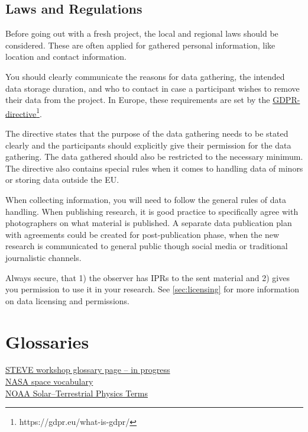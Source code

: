 \documentclass{article}
\begin{document}
\subsection{Laws and Regulations}\label{sec:data_law}

Before going out with a fresh project, the local and regional laws should be considered. These are often applied for gathered personal information, like location and contact information.  

You should clearly communicate the reasons for data gathering, the intended data storage duration, and who to contact in case a participant wishes to remove their data from the project. In Europe, these requirements are set by the \href{https://gdpr.eu/what-is-gdpr/}{GDPR-directive}\footnote{https://gdpr.eu/what-is-gdpr/}.

The directive states that the purpose of the data gathering needs to be stated clearly and the participants should explicitly give their permission for the data gathering. The data gathered should also be restricted to the necessary minimum. The directive also contains special rules when it comes to handling data of minors or storing data outside the EU.

When collecting information, you will need to follow the general rules of data handling. When publishing research, it is good practice to specifically agree with photographers on what material is published. A separate data publication plan with agreements could be created for post-publication phase, when the new research is communicated to general public though social media or traditional journalistic channels.  

Always secure, that 1) the observer has IPRs to the sent material and 2) gives you permission to use it in your research. See \ref{sec:licensing} for more information on data licensing and permissions. 



\section{Glossaries}

\href{https://steve-aurora.github.io/glossary/}{STEVE workshop glossary page -- in progress}\\

\noindent\href{https://science.nasa.gov/heliophysics/resources/vocabulary/}{NASA space vocabulary}\\

\noindent\href{https://www.ngdc.noaa.gov/stp/glossary/glossary.html}{NOAA Solar--Terrestrial Physics Terms}\\



% 
%
\printbibliography

\printindex
\end{document}
